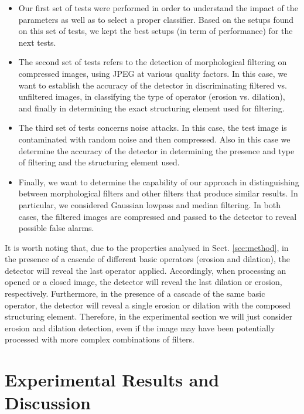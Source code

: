 \documentclass[review]{elsarticle}
\begin{document}
\begin{itemize}
\item Our first set of tests were performed in order to understand the impact of the parameters as well as to select a proper classifier. Based on the setups found on this set of tests, we kept the best setups (in term of performance) for the next tests.

\item The second set of tests refers to the detection of morphological filtering on compressed images, using JPEG at various quality factors. In this case, we want to establish the accuracy of the detector in discriminating filtered vs. unfiltered images, in classifying the type of operator (erosion vs. dilation), and finally in determining the exact structuring element used for filtering. 

\item The third set of tests concerns noise attacks. In this case, the test image is contaminated with random noise and then compressed. Also in this case we determine the accuracy of the detector in determining the presence and type of filtering and the structuring element used.

\item Finally, we want to determine the capability of our approach in distinguishing between morphological filters and other filters that produce similar results. In particular, we considered Gaussian lowpass and median filtering. In both cases, the filtered images are compressed and passed to the detector to reveal possible false alarms.
	
\end{itemize}

It is worth noting that, due to the properties analysed in Sect. \ref{sec:method}, in the presence of a cascade of different basic operators (erosion and dilation), the detector will reveal the last operator applied. Accordingly, when processing an opened or a closed image, the detector will reveal the last dilation or erosion, respectively. Furthermore, in the presence of a cascade of the same basic operator, the detector will reveal a single erosion or dilation with the composed structuring element. Therefore, in the experimental section we will just consider erosion and dilation detection, even if the image may have been potentially processed with more complex combinations of filters.


\section{Experimental Results and Discussion}
\end{document}
